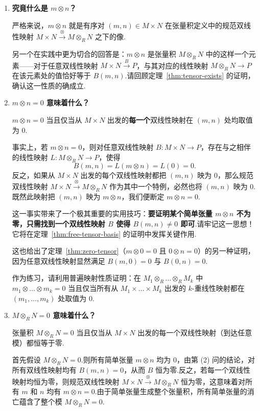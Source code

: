 \begin{enumerate}
  \item \textbf{究竟什么是 $m \otimes n$？}
  
  严格来说，$m \otimes n$ 就是有序对 $(m, n) \in M \times N$ 在张量积定义中的规范双线性映射 $M \times N \xrightarrow{\otimes} M \otimes_R N$ 之下的像.
  
  另一个在实践中更为切合的回答是：$m \otimes n$ 是张量积 $M \otimes_R N$ 中的这样一个元素——对于任意双线性映射 $M \times N \xrightarrow{B} P$，与其对应的线性映射 $M \otimes_R N \to P$ 在该元素处的值恰好等于 $B(m, n)$.请回顾定理~\ref{thm:tensor-exists} 的证明，确认这一性质的确成立.
  
  \item \textbf{$m \otimes n = 0$ 意味着什么？}
  
  $m \otimes n = 0$ 当且仅当从 $M \times N$ 出发的\textbf{每一个}双线性映射在 $(m, n)$ 处均取值为 $0$.
  
  事实上，若 $m \otimes n = 0$，则对任意双线性映射 $B \colon M \times N \to P$，存在与之相伴的线性映射 $L \colon M \otimes_R N \to P$，使得
  \[
    B(m, n) = L(m \otimes n) = L(0) = 0.
  \]
  反之，如果从 $M \times N$ 出发的每个双线性映射都把 $(m, n)$ 映为 $0$，那么规范双线性映射 $M \times N \xrightarrow{\otimes} M \otimes_R N$ 作为其中一个特例，必然也将 $(m, n)$ 映为 $0$.既然此映射把 $(m, n)$ 映为 $m \otimes n$，我们便断定 $m \otimes n = 0$.
  
  这一事实带来了一个极其重要的实用技巧：\textbf{要证明某个简单张量 $m \otimes n$ 不为零，只需找到一个双线性映射 $B$ 使得 $B(m, n) \neq 0$ 即可}.请牢记这一思想！它将在定理~\ref{thm:free-tensor-basis} 的证明中发挥关键作用.
  
  这也给出了定理~\ref{thm:zero-tensor}（$m \otimes 0 = 0$ 且 $0 \otimes n = 0$）的另一种证明，因为任意双线性映射显然满足 $B(m, 0) = 0$ 与 $B(0, n) = 0$.
  
  作为练习，请利用普遍映射性质证明：在 $M_1 \otimes_R \dots \otimes_R M_k$ 中 $m_1 \otimes \dots \otimes m_k = 0$ 当且仅当所有从 $M_1 \times \dots \times M_k$ 出发的 $k$-重线性映射都在 $(m_1, \dots, m_k)$ 处取值为 $0$.
  
  \item \textbf{$M \otimes_R N = 0$ 意味着什么？}
  
  张量积 $M \otimes_R N = 0$ 当且仅当从 $M \times N$ 出发的每一个双线性映射（到达任意模）都恒等于零.
  
  首先假设 $M \otimes_R N = 0$.则所有简单张量 $m \otimes n$ 均为 $0$，由第 (2) 问的结论，对所有双线性映射均有 $B(m, n) = 0$，从而 $B$ 恒为零.反之，若每一个双线性映射均恒为零，则规范双线性映射 $M \times N \xrightarrow{\otimes} M \otimes_R N$ 恒为零，这意味着对所有 $m$ 和 $n$ 均有 $m \otimes n = 0$.由于简单张量生成整个张量积，所有简单张量的消亡蕴含了整个模 $M \otimes_R N = 0$.
  

\end{enumerate}
